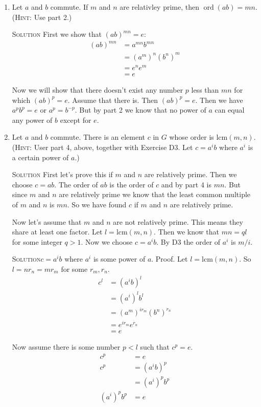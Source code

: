 \documentclass[twoside]{amsart}
\newcommand{\solution}{\textsc{Solution}\xspace}
\newcommand{\blank}{\vspace{5pt}}
\newcommand{\itm}{\blank\item}
\newcommand{\sol}{\blank\noindent\solution}
\newcommand{\ord}{\mathop{\mathrm{ord}}}
\begin{document}
\begin{enumerate}[A.]
\begin{enumerate}[1]
      \itm Let $a$ and $b$ commute. If $m$ and $n$ are relativley prime,
      then $\ord(ab) = mn$. (\textsc{Hint}: Use part 2.)

      \sol First we show that $(ab)^{mn} = e$:
      \begin{align*}
         (ab)^{mn} &= a^{mn}b^{mn} \\
                   &= (a^m)^n (b^n)^m \\
                   &= e^n e^m \\
                   &= e
      \end{align*}

      Now we will show that there doesn't exist any number $p$ less than
      $mn$ for which $(ab)^p = e$. Assume that there is. Then $(ab)^p = e$.
      Then we have $a^pb^p = e$ or $a^p = b^{-p}$. But by part 2 we know
      that no power of $a$ can equal any power of $b$ except for $e$.

      \itm Let $a$ and $b$ commute. There is an element $c$ in $G$ whose
      order is $\mathrm{lcm}(m,n)$. (\textsc{Hint}: User part 4, above, 
      together with Exercise D3. Let $c=a^ib$ where $a^i$ is a certain
      power of $a$.)

      \sol First let's prove this if $m$ and $n$ are relatively prime.
      Then we choose $c = ab$. The order of $ab$ is the order of $c$ and by
      part 4 is $mn$. But since $m$ and $n$ are relatively prime we know
      that the least common multiple of $m$ and $n$ is $mn$. So we
      have found $c$ if $m$ and $n$ are relatively prime.

      \blank
      Now let's assume that $m$ and $n$ are not relatively prime. This
      means they share at least one factor. Let $l = \mathrm{lcm}( 
      m,n)$. Then we know that $mn = ql$ for some integer $q > 1$.
      Now we choose $c = a^ib$. By D3 the order of $a^i$ is $m/i$.


      \sol $c = a^ib$ where $a^i$ is some power of $a$. Proof.
      Let $l = \mathrm{lcm}(m,n)$. So $l = nr_n = mr_m$ for some $r_m, r_n$.
      \begin{align*}
         c^l &= (a^ib)^l \\
             &= (a^i)^lb^l \\
             &= (a^m)^{ir_m} (b^n)^{r_n} \\
             &= e^{ir_m} e^{r_n} \\
             &= e
      \end{align*}

      Now assume there is some number $p < l$ such that $c^p = e$.
      \begin{align*}
         c^p &= e \\
         c^p &= (a^ib)^p \\
             &= (a^i)^p b^p \\
         (a^i)^p b^p &= e 
      \end{align*}


\end{enumerate}
\end{enumerate}
\end{document}
